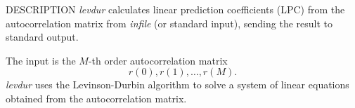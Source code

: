 \begin{synopsis}
 \item [levdur] [ --m $M$ ] [ --f $F$ ] [ {\em infile} ] 
\end{synopsis}

\begin{qsection}{DESCRIPTION}
{\em levdur} calculates linear prediction coefficients (LPC) 
from the autocorrelation matrix from {\em infile} (or standard input), 
sending the result to standard output.

The input is the $M$-th order autocorrelation matrix
\begin{displaymath}
  r(0),r(1),\dots,r(M).
\end{displaymath}
{\em levdur} uses the Levinson-Durbin algorithm 
to solve a system of linear equations
obtained from the autocorrelation matrix.


\end{qsection}
